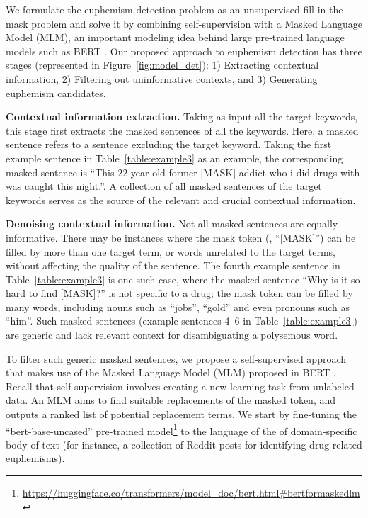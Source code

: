 We formulate the euphemism detection problem as an unsupervised fill-in-the-mask problem and solve it by combining self-supervision with a Masked Language Model (MLM), an important modeling idea behind large pre-trained language models such as BERT \cite{devlin2019bert}. 
Our proposed approach to euphemism detection has three stages (represented  in Figure~\ref{fig:model_det}): 
1) Extracting contextual information, 
2) Filtering out uninformative contexts, and 
3) Generating euphemism candidates.  

\noindent\textbf{Contextual information extraction.} Taking as input all the target keywords, this stage first extracts the masked sentences of all the keywords. 
Here, a masked sentence refers to a sentence excluding the target keyword. 
Taking the first example sentence in Table~\ref{table:example3} as an example, the corresponding masked sentence is ``This 22 year old former [MASK] addict who i did drugs with was caught this night.''. 
A collection of all  masked sentences of the target keywords serves as the source of the relevant and crucial contextual information. 

\noindent\textbf{Denoising contextual information.} Not all masked sentences are equally informative. 
There may be  instances where the mask token (\ie, ``[MASK]'') can be filled by more than one target term, or words unrelated to the target terms, without affecting the quality of the sentence. 
The fourth example sentence 
in Table~\ref{table:example3} is one such case, where the masked sentence ``Why is it so hard to find [MASK]?'' is not specific to a drug; the mask token can be filled  by many words, including nouns such as ``jobs'', ``gold'' and even pronouns such as ``him''. 
Such masked sentences (example sentences 4--6 
in Table~\ref{table:example3}) are generic and lack relevant  context for disambiguating a polysemous word. 

To filter such generic masked sentences, we propose a self-supervised approach that makes use of the Masked Language Model (MLM) proposed in BERT \cite{devlin2019bert}.
Recall that self-supervision involves creating a new learning task from unlabeled data.
An MLM aims to find suitable replacements of the masked token, and outputs a ranked list of potential replacement terms.  
We start by fine-tuning the ``bert-base-uncased'' pre-trained model\footnote{ \url{https://huggingface.co/transformers/model\_doc/bert.html\#bertformaskedlm}} to the language of the  of domain-specific body of text (for instance, a collection of Reddit posts for identifying drug-related euphemisms).

